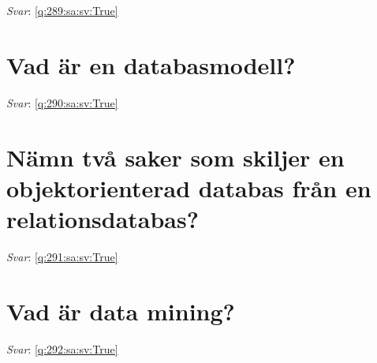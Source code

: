 \documentclass[a4paper,11pt,oneside]{book}
\begin{document}
\begin{sloppypar}
\label{q:289:sa:sv:False}

\vspace{2cm}

\noindent\makebox[\textwidth]{\hrulefill}

\vspace{1cm}

\textit{Svar}: \autoref{q:289:sa:sv:True}



\section{Vad \"ar en databasmodell?}

\label{q:290:sa:sv:False}

\vspace{2cm}

\noindent\makebox[\textwidth]{\hrulefill}

\vspace{1cm}

\textit{Svar}: \autoref{q:290:sa:sv:True}



\section{N\"amn tv\r{a} saker som skiljer en objektorienterad databas fr\r{a}n en relationsdatabas?}

\label{q:291:sa:sv:False}

\vspace{2cm}

\noindent\makebox[\textwidth]{\hrulefill}

\vspace{1cm}

\textit{Svar}: \autoref{q:291:sa:sv:True}



\section{Vad \"ar data mining?}

\label{q:292:sa:sv:False}

\vspace{2cm}

\noindent\makebox[\textwidth]{\hrulefill}

\vspace{1cm}

\textit{Svar}: \autoref{q:292:sa:sv:True}




\end{sloppypar}
\end{document}
